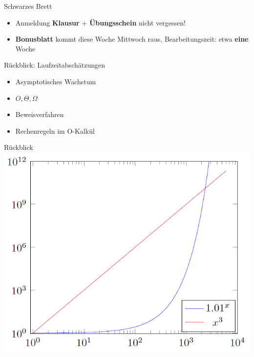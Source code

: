 




\graphicspath{{../figures/}}

\morescalingdelimiters



\begin{frame}{Schwarzes Brett}
	\begin{itemize}
		\item Anmeldung \textbf{Klausur} $+$ \textbf{Übungsschein} nicht vergessen!
		\item \textbf{Bonusblatt} kommt diese Woche Mittwoch raus, Bearbeitungszeit: etwa \textbf{eine} Woche
	\end{itemize}
\end{frame}

\framePrevEpisode

\begin{frame}{Rückblick: Laufzeitabschätzungen}
	\begin{itemize}[<+->]
		\item Asymptotisches Wachstum
		\item $O, \Theta, \Omega$
		\item Beweisverfahren
		\item Rechenregeln im O-Kalkül
	\end{itemize}
\end{frame}

\begin{frame}{Rückblick}
	\centering
	\includegraphics[scale=0.5]{laufzeit/polyVsExp}
\end{frame}

